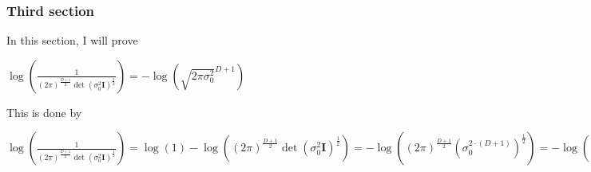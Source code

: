 \documentclass{report}
\begin{document}
\subsubsection*{Third section}
In this section, I will prove
\begin{center}
    \begin{math}
        \log \left( \frac{1}{(2 \pi)^\frac{D+1}{2} \det(\sigma_0^2 \bm{I})^\frac{1}{2}} \right) 
        = - \log \left( \sqrt{2 \pi \sigma_0^2}^{D + 1} \right)
    \end{math}
\end{center}
This is done by
\begin{center}
    \begin{math}
        \log \left( \frac{1}{(2 \pi)^\frac{D+1}{2} \det(\sigma_0^2 \bm{I})^\frac{1}{2}} \right) 
        = \log(1) - \log((2 \pi)^\frac{D+1}{2} \det(\sigma_0^2 \bm{I})^\frac{1}{2})
        = - \log((2 \pi)^\frac{D+1}{2} \left( \sigma_0^{2 \cdot (D + 1)} \right)^\frac{1}{2})
        = - \log((2 \pi)^\frac{D+1}{2} \left( \sigma_0^{2} \right)^\frac{D + 1}{2})
        = - \log((2 \pi)^{\left(\frac{1}{2}\right)^D} \left( \sigma_0^{2} \right)^{\left(\frac{1}{2}\right)^D})
        = - \log (2 \pi \sigma_0^{2})^{\left(\frac{1}{2}\right)^D}
        = - \log \sqrt{(2 \pi \sigma_0^{2})}^D
    \end{math}
\end{center}

\subsubsection{}
\end{document}
